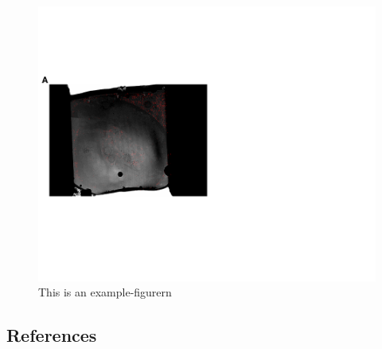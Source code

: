 \documentclass[
]{article}
\begin{document}
\begin{figure}
\hypertarget{fig:matching}{%
\centering
\includegraphics{figures/matching.pdf}
\caption{This is an example-figurern}\label{fig:matching}
}
\end{figure}

\hypertarget{references}{%
\subsection{References}\label{references}}
\end{document}

